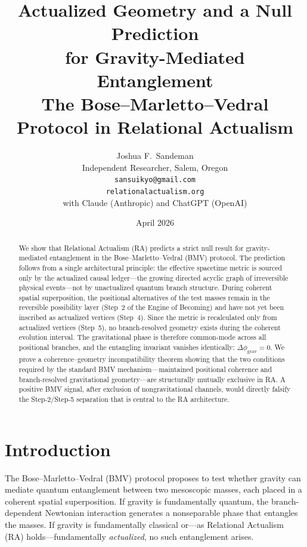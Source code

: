 \documentclass[12pt,a4paper]{article}
\title{Actualized Geometry and a Null Prediction\\
for Gravity-Mediated Entanglement\\[6pt]
{\large The Bose--Marletto--Vedral Protocol in Relational Actualism}}
\author{Joshua F.\ Sandeman\\
{\small Independent Researcher, Salem, Oregon}\\
{\small \texttt{sansuikyo@gmail.com}}\\
{\small \texttt{relationalactualism.org}}\\[6pt]
{\small with Claude (Anthropic) and ChatGPT (OpenAI)}}
\date{April 2026}
\begin{document}
\maketitle

\begin{abstract}
We show that Relational Actualism (RA) predicts a strict null result
for gravity-mediated entanglement in the Bose--Marletto--Vedral (BMV)
protocol. The prediction follows from a single architectural principle:
the effective spacetime metric is sourced only by the actualized causal
ledger---the growing directed acyclic graph of irreversible physical
events---not by unactualized quantum branch structure. During coherent
spatial superposition, the positional alternatives of the test masses
remain in the reversible possibility layer (Step~2 of the Engine of
Becoming) and have not yet been inscribed as actualized vertices
(Step~4). Since the metric is recalculated only from actualized
vertices (Step~5), no branch-resolved geometry exists during the
coherent evolution interval. The gravitational phase is therefore
common-mode across all positional branches, and the entangling
invariant vanishes identically: $\Delta\phi_{\mathrm{grav}} = 0$.
We prove a coherence--geometry incompatibility theorem showing that
the two conditions required by the standard BMV mechanism---maintained
positional coherence and branch-resolved gravitational geometry---are
structurally mutually exclusive in RA. A positive BMV signal, after
exclusion of nongravitational channels, would directly falsify the
Step-2/Step-5 separation that is central to the RA architecture.
\end{abstract}

\tableofcontents

\section{Introduction}
\label{sec:intro}

The Bose--Marletto--Vedral (BMV) protocol \cite{Bose2017,Marletto2017}
proposes to test whether gravity can mediate quantum entanglement
between two mesoscopic masses, each placed in a coherent spatial
superposition. If gravity is fundamentally quantum, the branch-dependent
Newtonian interaction generates a nonseparable phase that entangles
the masses. If gravity is fundamentally classical or---as Relational
Actualism (RA) holds---fundamentally \emph{actualized}, no such
entanglement arises.
\end{document}
